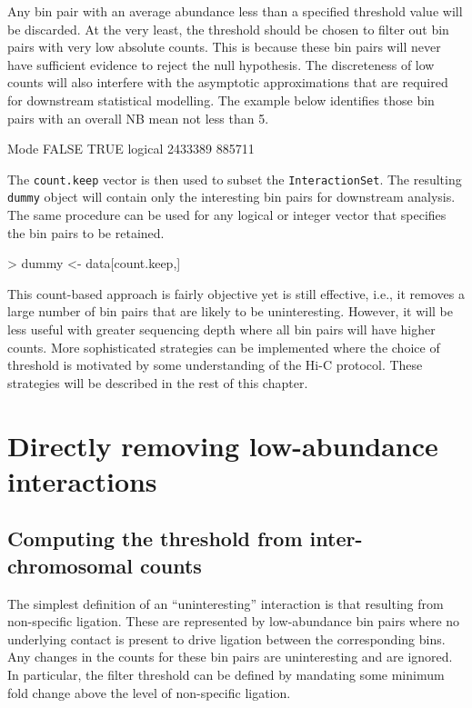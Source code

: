 \documentclass[12pt]{report}
\renewenvironment{Schunk}{\vspace{0pt}}{\vspace{0pt}}
\newcommand{\code}[1]{{\small\texttt{#1}}}
\begin{document}
Any bin pair with an average abundance less than a specified threshold value will be discarded.
At the very least, the threshold should be chosen to filter out bin pairs with very low absolute counts.
This is because these bin pairs will never have sufficient evidence to reject the null hypothesis.
The discreteness of low counts will also interfere with the asymptotic approximations that are required for downstream statistical modelling.
The example below identifies those bin pairs with an overall NB mean not less than 5.

\begin{Schunk}
\begin{Soutput}
   Mode   FALSE    TRUE 
logical 2433389  885711 
\end{Soutput}
\end{Schunk}

The \code{count.keep} vector is then used to subset the \code{InteractionSet}.
The resulting \code{dummy} object will contain only the interesting bin pairs for downstream analysis.
The same procedure can be used for any logical or integer vector that specifies the bin pairs to be retained.

\begin{Schunk}
\begin{Sinput}
> dummy <- data[count.keep,]
\end{Sinput}
\end{Schunk}

This count-based approach is fairly objective yet is still effective, i.e., it removes a large number of bin pairs that are likely to be uninteresting.
However, it will be less useful with greater sequencing depth where all bin pairs will have higher counts.
More sophisticated strategies can be implemented where the choice of threshold is motivated by some understanding of the Hi-C protocol.
These strategies will be described in the rest of this chapter.

\section{Directly removing low-abundance interactions}
\label{sec:direct}

\subsection{Computing the threshold from inter-chromosomal counts}
The simplest definition of an ``uninteresting'' interaction is that resulting from non-specific ligation. 
These are represented by low-abundance bin pairs where no underlying contact is present to drive ligation between the corresponding bins. 
Any changes in the counts for these bin pairs are uninteresting and are ignored.
In particular, the filter threshold can be defined by mandating some minimum fold change above the level of non-specific ligation.
\end{document}

